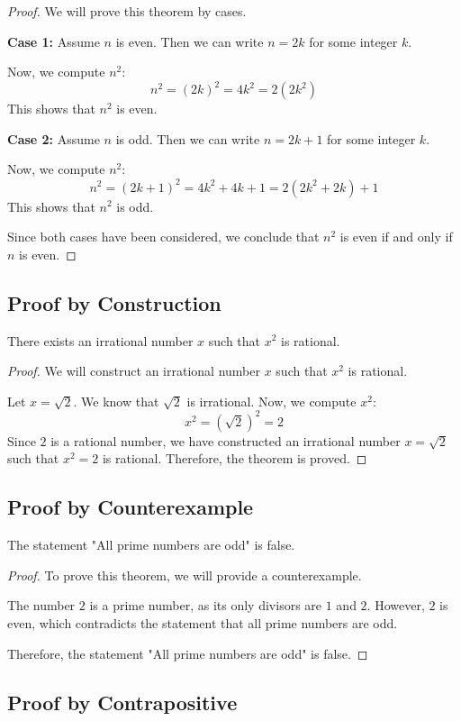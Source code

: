 \begin{proof}
	We will prove this theorem by cases.

	\textbf{Case 1:} Assume \( n \) is even. Then we can write \( n = 2k \) for some integer \( k \).

	Now, we compute \( n^2 \):
	\[
		n^2 = (2k)^2 = 4k^2 = 2(2k^2)
	\]
	This shows that \( n^2 \) is even.

	\textbf{Case 2:} Assume \( n \) is odd. Then we can write \( n = 2k + 1 \) for some integer \( k \).

	Now, we compute \( n^2 \):
	\[
		n^2 = (2k + 1)^2 = 4k^2 + 4k + 1 = 2(2k^2 + 2k) + 1
	\]
	This shows that \( n^2 \) is odd.

	Since both cases have been considered, we conclude that \( n^2 \) is even if and only if \( n \) is even.
\end{proof}
\subsection{Proof by Construction}

There exists an irrational number \( x \) such that \( x^2 \) is rational.

\begin{proof}
	We will construct an irrational number \( x \) such that \( x^2 \) is rational.

	Let \( x = \sqrt{2} \). We know that \( \sqrt{2} \) is irrational. Now, we compute \( x^2 \):
	\[
		x^2 = (\sqrt{2})^2 = 2
	\]
	Since \( 2 \) is a rational number, we have constructed an irrational number \( x = \sqrt{2} \) such that \( x^2 = 2 \) is rational.
	Therefore, the theorem is proved.
\end{proof}
\subsection{Proof by Counterexample}

The statement "All prime numbers are odd" is false.

\begin{proof}
	To prove this theorem, we will provide a counterexample.

	The number \( 2 \) is a prime number, as its only divisors are \( 1 \) and \( 2 \). However, \( 2 \) is even, which contradicts the statement that all prime numbers are odd.

	Therefore, the statement "All prime numbers are odd" is false.
\end{proof}
\subsection{Proof by Contrapositive}

